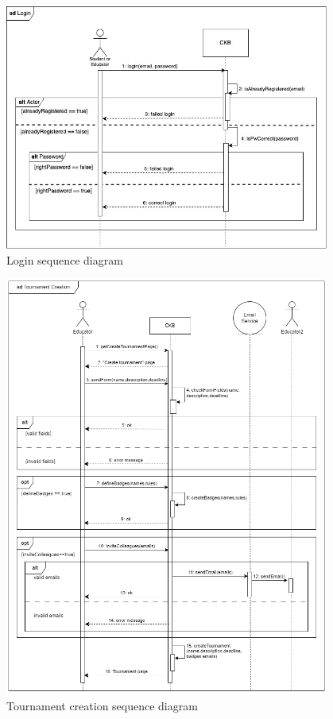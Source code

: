 \begin{figure}[H]
    \centering
    \includegraphics[width=0.95\textwidth]{images/seq_diagrams/Login.jpg}
    \caption{Login sequence diagram}
    \label{fig:sequence_diagram}
\end{figure}
\clearpage

\begin{figure}[H]
    \centering
    \includegraphics[width=0.95\textwidth]{images/seq_diagrams/tournament_creation.png}
    \caption{Tournament creation sequence diagram}
    \label{fig:sequence_diagram}
\end{figure}
\clearpage

